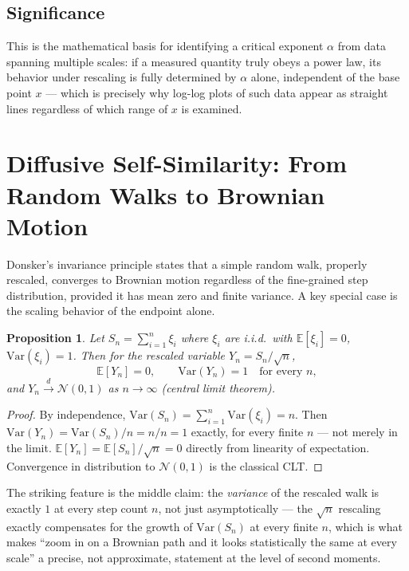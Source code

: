 \documentclass[10pt,journal,compsoc]{IEEEtran}
\newtheorem{proposition}{Proposition}
\begin{document}
\subsection{Significance}
This is the mathematical basis for identifying a critical exponent $\alpha$ from data spanning multiple scales: if a measured quantity truly obeys a power law, its behavior under rescaling is fully determined by $\alpha$ alone, independent of the base point $x$ — which is precisely why log-log plots of such data appear as straight lines regardless of which range of $x$ is examined.

\section{Diffusive Self-Similarity: From Random Walks to Brownian Motion}
Donsker's invariance principle states that a simple random walk, properly rescaled, converges to Brownian motion regardless of the fine-grained step distribution, provided it has mean zero and finite variance. A key special case is the scaling behavior of the endpoint alone.

\begin{proposition}
Let $S_n = \sum_{i=1}^n \xi_i$ where $\xi_i$ are i.i.d.\ with $\mathbb{E}[\xi_i]=0$, $\mathrm{Var}(\xi_i)=1$. Then for the rescaled variable $Y_n = S_n/\sqrt{n}$,
\begin{equation}
    \mathbb{E}[Y_n] = 0, \qquad \mathrm{Var}(Y_n) = 1 \quad \text{for every } n,
\end{equation}
and $Y_n \xrightarrow{d} \mathcal{N}(0,1)$ as $n\to\infty$ (central limit theorem).
\end{proposition}
\begin{proof}
By independence, $\mathrm{Var}(S_n) = \sum_{i=1}^n \mathrm{Var}(\xi_i) = n$. Then $\mathrm{Var}(Y_n) = \mathrm{Var}(S_n)/n = n/n = 1$ exactly, for every finite $n$ — not merely in the limit. $\mathbb{E}[Y_n]=\mathbb{E}[S_n]/\sqrt n = 0$ directly from linearity of expectation. Convergence in distribution to $\mathcal{N}(0,1)$ is the classical CLT.
\end{proof}
The striking feature is the middle claim: the \emph{variance} of the rescaled walk is exactly $1$ at every step count $n$, not just asymptotically — the $\sqrt{n}$ rescaling exactly compensates for the growth of $\mathrm{Var}(S_n)$ at every finite $n$, which is what makes ``zoom in on a Brownian path and it looks statistically the same at every scale'' a precise, not approximate, statement at the level of second moments.
\end{document}
